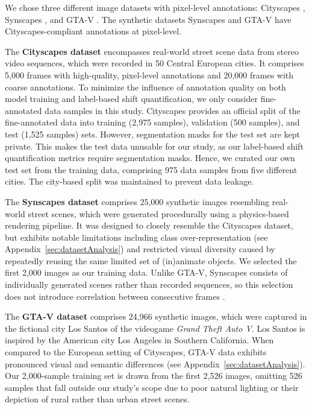 \documentclass[conference]{IEEEtran}
\begin{document}
We chose three different image datasets with pixel-level annotations: Cityscapes \cite{cityscapes}, Synscapes \cite{synscapes}, and GTA-V \cite{GTA_V}. The synthetic datasets Synscapes and GTA-V have Cityscapes-compliant annotations at pixel-level. 

The \textbf{Cityscapes dataset} \cite{cityscapes} encompasses real-world street scene data from stereo video sequences, which were recorded in 50 Central European cities. It comprises 5,000 frames with high-quality, pixel-level annotations and 20,000 frames with coarse annotations. To minimize the influence of annotation quality on both model training and label-based shift quantification, we only consider fine-annotated data samples in this study. Cityscapes provides an official split of the fine-annotated data into training (2,975 samples), validation (500 samples), and test (1,525 samples) sets. However, segmentation masks for the test set are kept private. This makes the test data unusable for our study, as our label-based shift quantification metrics require segmentation masks. Hence, we curated our own test set from the training data, comprising 975 data samples from five different cities. The city-based split was maintained to prevent data leakage.

The \textbf{Synscapes dataset} \cite{synscapes} comprises 25,000 synthetic images resembling real-world street scenes, which were generated procedurally using a physics-based rendering pipeline. It was designed to closely resemble the Cityscapes dataset, but exhibits notable limitations including class over-representation (see Appendix~\ref{sec:datasetAnalysis}) and restricted visual diversity caused by repeatedly reusing the same limited set of (in)animate objects. We selected the first 2,000 images as our training data. Unlike GTA-V, Synscapes consists of individually generated scenes rather than recorded sequences, so this selection does not introduce correlation between consecutive frames \cite{synscapes}.

The \textbf{GTA-V dataset} \cite{GTA_V} comprises 24,966 synthetic images, which were captured in the fictional city Los Santos of the videogame \textit{Grand Theft Auto V}. Los Santos is inspired by the American city Los Angeles in Southern California. When compared to the European setting of Cityscapes, GTA-V data exhibits pronounced visual and semantic differences (see Appendix~\ref{sec:datasetAnalysis}). Our 2,000-sample training set is drawn from the first 2,526 images, omitting 526 samples that fall outside our study's scope due to poor natural lighting or their depiction of rural rather than urban street scenes.
\end{document}
